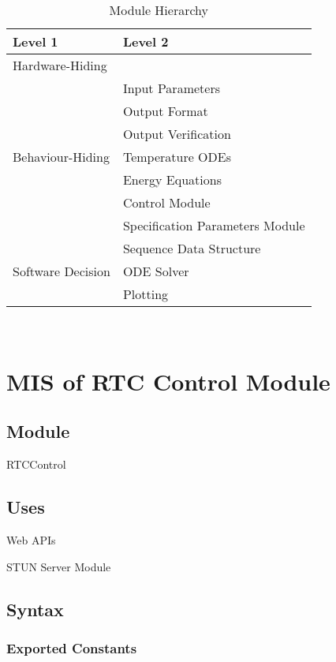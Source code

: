 \documentclass[12pt, titlepage]{article}
\begin{document}
\begin{table}[h!]
\centering
\begin{tabular}{p{} p{}}
\toprule
\textbf{Level 1} & \textbf{Level 2}\\
\midrule

{Hardware-Hiding} & ~ \\
\midrule

\multirow{7}{0.3\textwidth}{Behaviour-Hiding} & Input Parameters\\
& Output Format\\
& Output Verification\\
& Temperature ODEs\\
& Energy Equations\\ 
& Control Module\\
& Specification Parameters Module\\
\midrule

\multirow{3}{0.3\textwidth}{Software Decision} & {Sequence Data Structure}\\
& ODE Solver\\
& Plotting\\
\bottomrule

\end{tabular}
\caption{Module Hierarchy}
\label{TblMH}
\end{table}

\newpage
~\newpage

\section{MIS of RTC Control Module} \label{sec:rtcctrl}

\subsection{Module}

RTCControl

\subsection{Uses}

\noindent Web APIs

\noindent STUN Server Module

\subsection{Syntax}

\subsubsection{Exported Constants}
\end{document}
